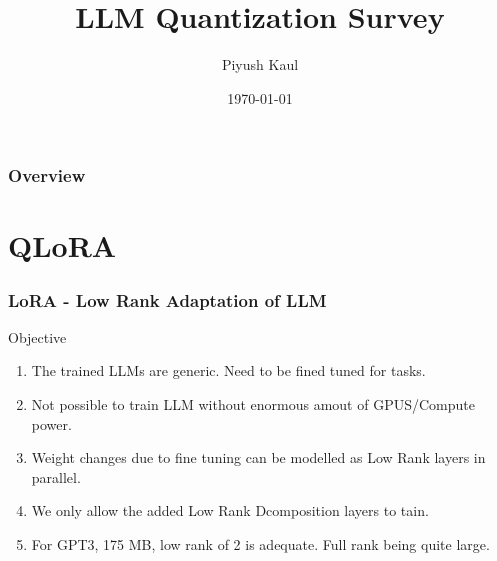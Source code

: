 \documentclass{beamer}
\title[LLM Quantization Survey]{LLM Quantization Survey} %
\author{Piyush Kaul } %
\institute[https://piyushkaul.github.io] %
{
 \\ %
\medskip
\textit{piyushkaul@ieee.org} %
}
\date{\today} %
\theoremstyle{plain}
\theoremstyle{definition}
\theoremstyle{remark}
\numberwithin{equation}{section}
\numberwithin{figure}{section}
\numberwithin{theorem}{section}
\begin{document}
\begin{frame}
\titlepage %
\end{frame}

\begin{frame}
\frametitle{Overview} %
\tableofcontents %
\end{frame}


\section{QLoRA} %


\begin{frame}
\frametitle{LoRA - Low Rank Adaptation of LLM}
Objective
\begin{enumerate}
  \item The trained LLMs are generic. Need to be fined tuned for tasks. 
  \item Not possible to train LLM without enormous amout of GPUS/Compute power.
  \item Weight changes due to fine tuning can be modelled as Low Rank layers in parallel.
  \item We only allow the added Low Rank Dcomposition layers to tain.
  \item For GPT3, 175 MB, low rank of 2 is adequate. Full rank being quite large.
\end{enumerate}
\end{frame}
\end{document}
